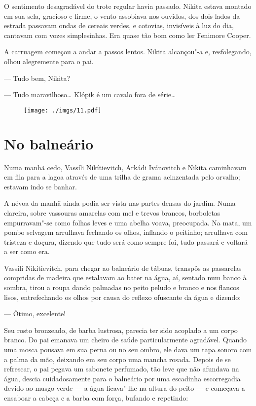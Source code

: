 O sentimento desagradável do trote regular havia passado. Nikita estava
montado em sua sela, gracioso e firme, o vento assobiava nos ouvidos,
dos dois lados da estrada passavam ondas de cereais verdes, e cotovias,
invisíveis à luz do dia, cantavam com vozes simplesinhas. Era quase tão
bom como ler Fenimore Cooper.

A carruagem começou a andar a passos lentos. Nikita alcançou"-a e,
resfolegando, olhou alegremente para o pai.

--- Tudo bem, Nikita?

--- Tudo maravilhoso\ldots{} Klópik é um cavalo fora de série\ldots{}


\begin{figure}
\vspace*{-2.65cm}
\hspace*{-2.85cm}\texttt{[image: ./imgs/11.pdf]}
\end{figure}


\chapter{No balneário}

Numa manhã cedo, Vassíli Nikítievitch, Arkádi Ivánovitch e Nikita
caminhavam em fila para a lagoa através de uma trilha de grama acinzentada pelo
orvalho; estavam indo se banhar.

A névoa da manhã ainda podia ser vista nas partes densas do jardim. Numa
clareira, sobre vassouras amarelas com mel e trevos brancos, borboletas
empurravam"-se como folhas leves e uma abelha voava, preocupada. Na mata,
um pombo selvagem arrulhava fechando os olhos, inflando o peitinho;
arrulhava com tristeza e doçura, dizendo que tudo será como sempre foi,
tudo passará e voltará a ser como era.

Vassíli Nikítievitch, para chegar ao balneário de tábuas, transpôs as passarelas compridas de madeira que estalavam ao bater na água, aí,
sentado num banco à sombra, tirou a roupa dando palmadas no peito peludo
e branco e nos flancos lisos, entrefechando os olhos por causa do reflexo
ofuscante da água e dizendo:

--- Ótimo, excelente!

Seu rosto bronzeado, de barba lustrosa, parecia ter sido acoplado a um
corpo branco. Do pai emanava um cheiro de saúde particularmente
agradável. Quando uma mosca pousava em sua perna ou no seu ombro, ele
dava um tapa sonoro com a palma da mão, deixando em seu corpo uma mancha
rosada. Depois de se refrescar, o pai pegava um sabonete perfumado, tão
leve que não afundava na água, descia cuidadosamente para o balneário
por uma escadinha escorregadia devido ao musgo verde --- a água
ficava"-lhe na altura do peito --- e começava a ensaboar a cabeça e a
barba com força, bufando e repetindo:

